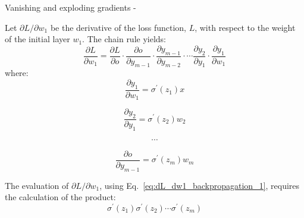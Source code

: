 \begin{frame}[t,allowframebreaks]{
    Vanishing and exploding gradients -}
    \framebreak


    Let $\displaystyle \partial L/\partial w_{1}$
    be the derivative of the loss function, $L$, 
    with respect to the weight of the initial layer $w_1$.
    The chain rule yields:
    \begin{equation}
        \frac{\partial L}{\partial w_{1}} = 
            \frac{\partial L}{\partial o}  \cdot
            \frac{\partial o}{\partial y_{m-1}}  \cdot
            \frac{\partial y_{m-1}}{\partial y_{m-2}} \cdot  
            \cdots
            \frac{\partial y_{2}}{\partial y_{1}} \cdot 
            \frac{\partial y_{1}}{\partial w_{1}}  
            \label{eq:dL_dw1_backpropagation_1}
    \end{equation}
    where:
    \begin{equation}
            \frac{\partial y_{1}}{\partial w_{1}}  =
              \sigma^{\prime}(z_{1}) x
    \end{equation}

    \begin{equation}
        \frac{\partial y_{2}}{\partial y_{1}}  =
          \sigma^{\prime}(z_{2}) w_{2}
    \end{equation}

    \begin{equation*}
        \cdots
    \end{equation*}

    \begin{equation}
        \frac{\partial o}{\partial y_{m-1}}  =
          \sigma^{\prime}(z_{m}) w_{m}
    \end{equation}

    \framebreak


    The evaluation of 
    $\displaystyle \partial L/\partial w_{1}$,
    using Eq.~\ref{eq:dL_dw1_backpropagation_1}, 
    requires the calculation of the product:
    \begin{equation*}
        \sigma^{\prime}(z_{1}) 
        \sigma^{\prime}(z_{2}) 
        \cdots
        \sigma^{\prime}(z_{m})
    \end{equation*}    


\end{frame}
